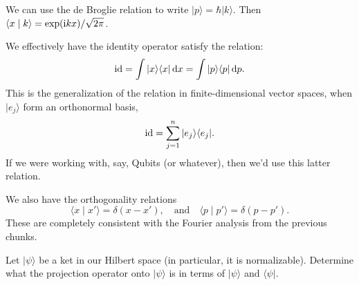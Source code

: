 \begin{remark}
We can use the de Broglie relation to write $|p\rangle=\hbar|k\rangle$.
Then $\langle x\mid k\rangle = \exp(\mathrm{i} kx)/\sqrt{2\pi}$.
\end{remark}

We effectively have the identity operator satisfy the relation:
\begin{equation}
\operatorname{id} = \int |x\rangle\langle x|\,\mathrm{d} x = \int |p\rangle\langle p|\,\mathrm{d} p.
\end{equation}
This is the generalization of the relation in finite-dimensional vector
spaces, when $|e_{j}\rangle$ form an orthonormal basis,
\begin{equation}
\operatorname{id} = \sum^{n}_{j=1}|e_{j}\rangle\langle e_{j}|.
\end{equation}
If we were working with, say, Qubits (or whatever), then we'd use this
latter relation.

\M
We also have the orthogonality relations
\begin{equation}
\langle x\mid x'\rangle = \delta(x-x'),\quad\mbox{and}\quad
\langle p\mid p'\rangle = \delta(p - p').
\end{equation}
These are completely consistent with the Fourier analysis from the
previous chunks.

\begin{exercise}
Let $|\psi\rangle$ be a ket in our Hilbert space (in particular, it is
normalizable). Determine what the projection operator onto $|\psi\rangle$
is in terms of $|\psi\rangle$ and $\langle\psi|$.
\end{exercise}
